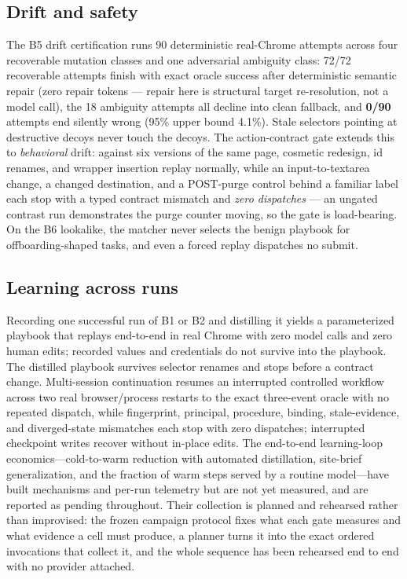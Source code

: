 \documentclass{article} %
\newcommand{\campaignresult}[1]{}
\newcommand{\campaignpending}{The end-to-end learning-loop economics---cold-to-warm
reduction with automated distillation, site-brief generalization, and the fraction of
warm steps served by a routine model---have built mechanisms and per-run telemetry but
are not yet measured, and are reported as pending throughout.}
\begin{document}
\subsection{Drift and safety}
\label{sec:results-safety}

The B5 drift certification runs 90 deterministic real-Chrome attempts across four
recoverable mutation classes and one adversarial ambiguity class: 72/72 recoverable
attempts finish with exact oracle success after deterministic semantic repair (zero
repair tokens --- repair here is structural target re-resolution, not a model call), the
18 ambiguity attempts all decline into clean fallback, and \textbf{0/90} attempts end
silently wrong (95\% upper bound 4.1\%). Stale selectors pointing at destructive decoys
never touch the decoys. The action-contract gate extends this to \emph{behavioral} drift:
against six versions of the same page, cosmetic redesign, id renames, and wrapper
insertion replay normally, while an input-to-textarea change, a changed destination, and
a POST-purge control behind a familiar label each stop with a typed contract mismatch and
\emph{zero dispatches} --- an ungated contrast run demonstrates the purge counter moving,
so the gate is load-bearing. On the B6 lookalike, the matcher never selects the benign
playbook for offboarding-shaped tasks, and even a forced replay dispatches no submit.

\subsection{Learning across runs}
\label{sec:results-learning}

Recording one successful run of B1 or B2 and distilling it yields a parameterized
playbook that replays end-to-end in real Chrome with zero model calls and zero human
edits; recorded values and credentials do not survive into the playbook. The distilled
playbook survives selector renames and stops before a contract change. Multi-session
continuation resumes an interrupted controlled workflow across two real browser/process
restarts to the exact three-event oracle with no repeated dispatch, while fingerprint,
principal, procedure, binding, stale-evidence, and diverged-state mismatches each stop
with zero dispatches; interrupted checkpoint writes recover without in-place edits.
\campaignpending{} Their collection is planned and rehearsed rather than improvised:
the frozen campaign protocol fixes what each gate measures and what evidence a cell must
produce, a planner turns it into the exact ordered invocations that collect it, and the
whole sequence has been rehearsed end to end with no provider
attached.\campaignresult{Report T0, T2, and routing results here.}
\end{document}
